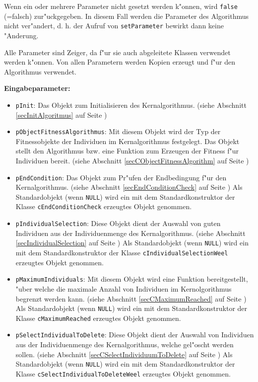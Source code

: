 Wenn ein oder mehrere Parameter nicht gesetzt werden k"onnen, wird \verb|false| (=falsch) zur"uckgegeben. In diesem Fall werden die Parameter des Algorithmus nicht ver"andert, d. h. der Aufruf von \verb|setParameter| bewirkt dann keine "Anderung.

Alle Parameter sind Zeiger, da f"ur sie auch abgeleitete Klassen verwendet werden k"onnen. Von allen Parametern werden Kopien erzeugt und f"ur den Algorithmus verwendet.

\bigskip\noindent
\textbf{Eingabeparameter:}
\begin{itemize}
 \item \verb|pInit|: Das Objekt zum Initialisieren des Kernalgorithmus. (siehe Abschnitt \ref{secInitAlgoritmus} auf Seite \pageref{secInitAlgoritmus})
 \item \verb|pObjectFitnessAlgorithmus|: Mit diesem Objekt wird der Typ der Fitnessobjekte der Individuen im Kernalgorithmus festgelegt. Das Objekt stellt den Algorithmus bzw. eine Funktion zum Erzeugen der Fitness f"ur Individuen bereit. (siehe Abschnitt \ref{secCObjectFitnessAlgorithm} auf Seite \pageref{secCObjectFitnessAlgorithm})
 \item \verb|pEndCondition|: Das Objekt zum Pr"ufen der Endbedingung f"ur den Kernalgorithmus. (siehe Abschnitt \ref{secEndConditionCheck} auf Seite \pageref{secEndConditionCheck}) Als Standardobjekt (wenn \verb|NULL|) wird ein mit dem Standardkonstruktor der Klasse \verb|cEndConditionCheck| erzeugtes Objekt genommen.
 \item \verb|pIndividualSelection|: Diese Objekt dient der Auswahl von guten Individuen aus der Individuenmenge des Kernalgorithmus. (siehe Abschnitt \ref{secIndividualSelection} auf Seite \pageref{secIndividualSelection}) Als Standardobjekt (wenn \verb|NULL|) wird ein mit dem Standardkonstruktor der Klasse \verb|cIndividualSelectionWeel| erzeugtes Objekt genommen.
 \item \verb|pMaximumIndividuals|: Mit diesem Objekt wird eine Funktion bereitgestellt, "uber welche die maximale Anzahl von Individuen im Kernolgorithmus begrenzt werden kann. (siehe Abschnitt \ref{secCMaximumReached} auf Seite \pageref{secCMaximumReached}) Als Standardobjekt (wenn \verb|NULL|) wird ein mit dem Standardkonstruktor der Klasse \verb|cMaximumReached| erzeugtes Objekt genommen.
 \item \verb|pSelectIndividualToDelete|: Diese Objekt dient der Auswahl von Individuen aus der Individuenmenge des Kernalgorithmus, welche gel"oscht werden sollen. (siehe Abschnitt \ref{secCSelectIndividuumToDelete} auf Seite \pageref{secCSelectIndividuumToDelete}) Als Standardobjekt (wenn \verb|NULL|) wird ein mit dem Standardkonstruktor der Klasse \verb|cSelectIndividualToDeleteWeel| erzeugtes Objekt genommen.

\end{itemize}
